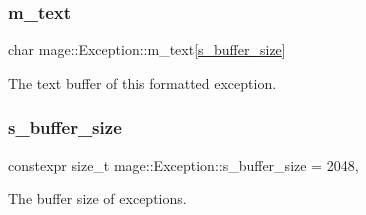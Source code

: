 \subsubsection{\texorpdfstring{m\+\_\+text}{m\_text}}
{\footnotesize\ttfamily char mage\+::\+Exception\+::m\+\_\+text\mbox{[}\mbox{\hyperlink{classmage_1_1_exception_a41c9eb8e4a238210822170dfa211e493}{s\+\_\+buffer\+\_\+size}}\mbox{]}\hspace{0.3cm}{\ttfamily [private]}}

The text buffer of this formatted exception. \mbox{\label{classmage_1_1_exception_a41c9eb8e4a238210822170dfa211e493}} 
\subsubsection{\texorpdfstring{s\+\_\+buffer\+\_\+size}{s\_buffer\_size}}
{\footnotesize\ttfamily constexpr size\+\_\+t mage\+::\+Exception\+::s\+\_\+buffer\+\_\+size = 2048\hspace{0.3cm}{\ttfamily [static]}, {\ttfamily [private]}}

The buffer size of exceptions. 